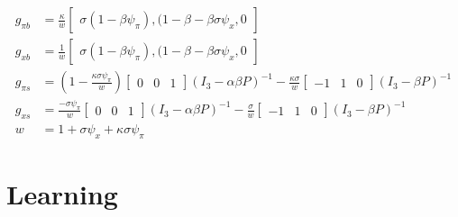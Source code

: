 \documentclass[11pt]{article}
\renewcommand{\[}{\begin{equation}}
\renewcommand{\]}{\end{equation}}
\begin{document}
\begin{align}
g_{\pi b} & = \frac{\kappa}{w} \begin{bmatrix}\sigma(1-\beta\psi_{\pi}), (1-\beta-\beta\sigma\psi_x, 0 \end{bmatrix}\\
g_{x b} & = \frac{1}{w} \begin{bmatrix}\sigma(1-\beta\psi_{\pi}), (1-\beta-\beta\sigma\psi_x, 0 \end{bmatrix} \\
g_{\pi s} & = (1-\frac{\kappa\sigma\psi_{\pi}}{w} )\begin{bmatrix} 0&0&1 \end{bmatrix} (I_3 - \alpha\beta P)^{-1} -\frac{\kappa\sigma}{w}\begin{bmatrix} -1&1&0 \end{bmatrix} (I_3 -\beta P)^{-1}\\
g_{x s} & =  \frac{-\sigma\psi_{\pi}}{w} \begin{bmatrix} 0&0&1 \end{bmatrix}(I_3 - \alpha\beta P)^{-1}  -\frac{\sigma}{w}\begin{bmatrix} -1&1&0 \end{bmatrix}(I_3 -\beta P)^{-1}\\
w & = 1+\sigma\psi_x +\kappa\sigma\psi_{\pi}
\end{align}
\clearpage

 \section{Learning}
\end{document}
